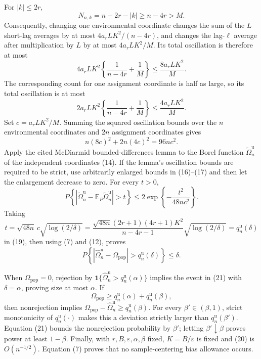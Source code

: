 For \(|k|\le2r\),
\[
 N_{n,k}=n-2r-|k|\ge n-4r>M. \tag{15}
\]
Consequently, changing one environmental coordinate changes the sum of the \(L\) short-lag averages by at most \(4a_rLK^2/(n-4r)\), and changes the lag-\(\ell\) average after multiplication by \(L\) by at most \(4a_rLK^2/M\).  Its total oscillation is therefore at most
\[
 4a_rLK^2\left\{\frac{1}{n-4r}+\frac{1}{M}\right\}
 \le \frac{8a_rLK^2}{M}. \tag{16}
\]
The corresponding count for one assignment coordinate is half as large, so its total oscillation is at most
\[
 2a_rLK^2\left\{\frac{1}{n-4r}+\frac{1}{M}\right\}
 \le \frac{4a_rLK^2}{M}. \tag{17}
\]
Set \(c=a_rLK^2/M\).  Summing the squared oscillation bounds over the \(n\) environmental coordinates and \(2n\) assignment coordinates gives
\[
 n(8c)^2+2n(4c)^2=96nc^2. \tag{18}
\]
Apply the cited McDiarmid bounded-differences lemma to the Borel function \(\widetilde\Omega_n^{\mathrm u}\) of the independent coordinates (14).  If the lemma's oscillation bounds are required to be strict, use arbitrarily enlarged bounds in (16)--(17) and then let the enlargement decrease to zero.  For every \(t>0\),
\[
 P\!\left\{
  \left|\widetilde\Omega_n^{\mathrm u}
  -\mathbb E_P\widetilde\Omega_n^{\mathrm u}\right|>t
 \right\}
 \le 2\exp\!\left\{-\frac{t^2}{48nc^2}\right\}. \tag{19}
\]
Taking
\[
 t=\sqrt{48n}\,c\sqrt{\log(2/\delta)}
 =\frac{\sqrt{48n}(2r+1)(4r+1)K^2}{n-4r-1}
   \sqrt{\log(2/\delta)}
 =q_n^{\mathrm u}(\delta) \tag{20}
\]
in (19), then using (7) and (12), proves
\[
 P\!\left\{
  \left|\widehat\Omega_n^{\mathrm u}-\Omega_{\mathrm{pop}}\right|
  >q_n^{\mathrm u}(\delta)
 \right\}\le\delta. \tag{21}
\]

When \(\Omega_{\mathrm{pop}}=0\), rejection by
\(\mathbf 1\{\widehat\Omega_n^{\mathrm u}>q_n^{\mathrm u}(\alpha)\}\)
implies the event in (21) with \(\delta=\alpha\), proving size at most \(\alpha\).  If
\[
 \Omega_{\mathrm{pop}}
 \ge q_n^{\mathrm u}(\alpha)+q_n^{\mathrm u}(\beta), \tag{22}
\]
then nonrejection implies
\(\Omega_{\mathrm{pop}}-\widehat\Omega_n^{\mathrm u}\ge q_n^{\mathrm u}(\beta)\).
For every \(\beta'\in(\beta,1)\), strict monotonicity of \(q_n^{\mathrm u}(\cdot)\) makes this a deviation strictly larger than \(q_n^{\mathrm u}(\beta')\).  Equation (21) bounds the nonrejection probability by \(\beta'\); letting \(\beta'\downarrow\beta\) proves power at least \(1-\beta\).  Finally, with \(r,B,\varepsilon,\alpha,\beta\) fixed, \(K=B/\varepsilon\) is fixed and (20) is \(O(n^{-1/2})\).  Equation (7) proves that no sample-centering bias allowance occurs.

